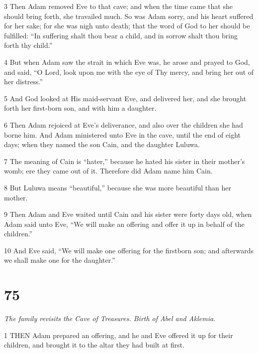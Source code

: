 \par 3 Then Adam removed Eve to that cave; and when the time came that she should bring forth, she travailed much. So was Adam sorry, and his heart suffered for her sake; for she was nigh unto death; that the word of God to her should be fulfilled: “In suffering shalt thou bear a child, and in sorrow shalt thou bring forth thy child.”

\par 4 But when Adam saw the strait in which Eve was, he arose and prayed to God, and said, “O Lord, look upon me with the eye of Thy mercy, and bring her out of her distress.”

\par 5 And God looked at His maid-servant Eve, and delivered her, and she brought forth her first-born son, and with him a daughter.

\par 6 Then Adam rejoiced at Eve's deliverance, and also over the children she had borne him. And Adam ministered unto Eve in the cave, until the end of eight days; when they named the son Cain, and the daughter Luluwa.

\par 7 The meaning of Cain is “hater,” because he hated his sister in their mother's womb; ere they came out of it. Therefore did Adam name him Cain.

\par 8 But Luluwa means “beautiful,” because she was more beautiful than her mother.

\par 9 Then Adam and Eve waited until Cain and his sister were forty days old, when Adam said unto Eve, “We will make an offering and offer it up in behalf of the children.”

\par 10 And Eve said, “We will make one offering for the firstborn son; and afterwards we shall make one for the daughter.”

\chapter{75}

\par \textit{The family revisits the Cave of Treasures. Birth of Abel and Aklemia.}

\par 1 THEN Adam prepared an offering, and he and Eve offered it up for their children, and brought it to the altar they had built at first.

